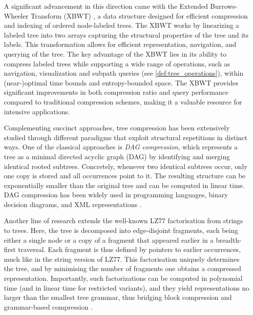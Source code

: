 A significant advancement in this direction came with the Extended Burrows-Wheeler Transform (XBWT) \cite{ferragina2009compressing}, a data structure designed for efficient compression and indexing of ordered node-labeled trees. The XBWT works by linearizing a labeled tree into two arrays capturing the structural properties of the tree and its labels. This transformation allows for efficient representation, navigation, and querying of the tree. The key advantage of the XBWT lies in its ability to compress labeled trees while supporting a wide range of operations, such as navigation, visualization and subpath queries (see \cref{def:tree_operations}), within (near-)optimal time bounds and entropy-bounded space. The XBWT provides significant improvements in both compression ratio and query performance compared to traditional compression schemes, making it a valuable resource for intensive applications.

Complementing succinct approaches, tree compression has been extensively studied through different paradigms that exploit structural repetitions in distinct ways. One of the classical approaches is \emph{DAG compression}, which represents a tree as a minimal directed acyclic graph (DAG) by identifying and merging identical rooted subtrees. Concretely, whenever two identical subtrees occur, only one copy is stored and all occurrences point to it. The resulting structure can be exponentially smaller than the original tree and can be computed in linear time. DAG compression has been widely used in programming languages, binary decision diagrams, and XML representations \cite{billeTreeCompressionTop2015}.

Another line of research extends the well-known LZ77 factorisation from strings to trees. Here, the tree is decomposed into edge-disjoint fragments, each being either a single node or a copy of a fragment that appeared earlier in a breadth-first traversal. Each fragment is thus defined by pointers to earlier occurrences, much like in the string version of LZ77. This factorisation uniquely determines the tree, and by minimising the number of fragments one obtains a compressed representation. Importantly, such factorizations can be computed in polynomial time (and in linear time for restricted variants), and they yield representations no larger than the smallest tree grammar, thus bridging block compression and grammar-based compression \cite{gawrychowskiLZ77FactorisationTrees2016}.

